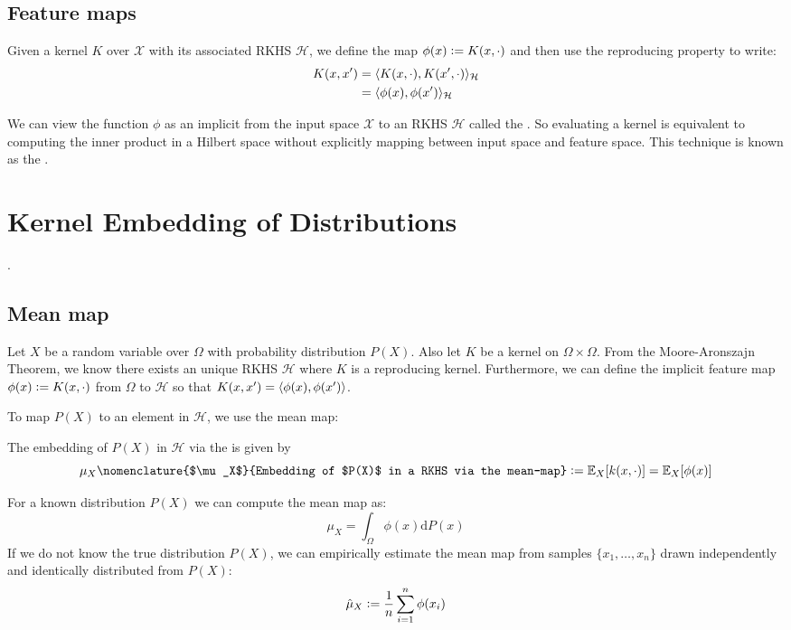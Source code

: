 \subsection{Feature maps}
Given a kernel $K$ over $\mathcal{X}$ with its associated RKHS $\mathcal{H}$, we define the map $\phi(x) \vcentcolon= K(x, \cdot)$ and then use the reproducing property to write:
\begin{align}
  K(x, x^\prime) &= \langle K(x, \cdot), K(x^\prime, \cdot)\rangle_\mathcal{H} \\
                                   &= \langle\phi(x), \phi(x^\prime)\rangle_\mathcal{H}
\end{align}

We can view the function $\phi$ as an implicit  from the input space $\mathcal{X}$ to an RKHS $\mathcal{H}$ called the . So evaluating a kernel is equivalent to computing the inner product in a Hilbert space without explicitly mapping between input space and feature space. This technique is known as the .

\section{Kernel Embedding of Distributions}
\citet{smola2007hilbert}.

\subsection{Mean map}
Let $X$ be a random variable over $\Omega$ with probability distribution $P(X)$. Also let $K$ be a kernel on $\Omega \times \Omega$. From the Moore-Aronszajn Theorem, we know there exists an unique RKHS $\mathcal{H}$ where $K$ is a reproducing kernel. Furthermore, we can define the implicit feature map $\phi(x) \vcentcolon= K(x, \cdot)$ from $\Omega$ to $\mathcal{H}$ so that $K(x, x^\prime) = \langle\phi(x), \phi(x^\prime)\rangle$.

To map $P(X)$ to an element in $\mathcal{H}$, we use the mean map:
%
\begin{definition}
The embedding of $P(X)$ in $\mathcal{H}$ via the  is given by
%
\begin{equation}
  \mu_{X}\nomenclature{$\mu_X$}{Embedding of $P(X)$ in a RKHS via the mean-map} \defeq \E_X[k(x, \cdot)] = \E_X[\phi(x)]
\end{equation}
\end{definition}
%
For a known distribution $P(X)$ we can compute the mean map as:
%
\begin{equation}
  \mu_{X} = \int_\Omega \phi(x) \mathrm{d}P(x)
\end{equation}
%
If we do not know the true distribution $P(X)$, we can empirically estimate the mean map from samples $\{ x_1, \dotsc, x_n \}$ drawn independently and identically distributed from $P(X)$:
%
\begin{equation}
   \hat{\mu}_{X} \vcentcolon= \frac{1}{n} \sum_{i=1}^n \phi(x_i)
\end{equation}

